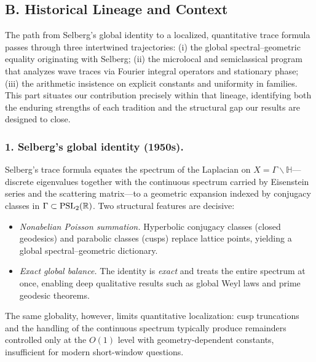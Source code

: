 
\subsection*{B. Historical Lineage and Context}

The path from Selberg’s global identity to a localized, quantitative trace formula
passes through three intertwined trajectories:
(i) the global spectral–geometric equality originating with Selberg;
(ii) the microlocal and semiclassical program that analyzes wave traces via Fourier integral operators and stationary phase;
(iii) the arithmetic insistence on explicit constants and uniformity in families.
This part situates our contribution precisely within that lineage, identifying
both the enduring strengths of each tradition and the structural gap our results are designed to close.

\medskip

\subsubsection*{1. Selberg’s global identity (1950s).}
Selberg’s trace formula \cite{Selberg1956} equates the spectrum of the Laplacian on
$X=\Gamma\backslash\mathbb{H}$—discrete eigenvalues together with the continuous spectrum
carried by Eisenstein series and the scattering matrix—to a geometric expansion
indexed by conjugacy classes in $\Gamma\subset\operatorname{PSL}_2(\mathbb{R})$.
Two structural features are decisive:
\begin{itemize}
  \item \emph{Nonabelian Poisson summation.} Hyperbolic conjugacy classes (closed geodesics)
        and parabolic classes (cusps) replace lattice points, yielding a global spectral–geometric dictionary.
  \item \emph{Exact global balance.} The identity is \emph{exact} and treats the entire spectrum at once,
        enabling deep qualitative results such as global Weyl laws and prime geodesic theorems.
\end{itemize}
The same globality, however, limits quantitative localization:
cusp truncations and the handling of the continuous spectrum typically produce remainders controlled only at the $O(1)$ level with geometry-dependent constants,
insufficient for modern short-window questions.

